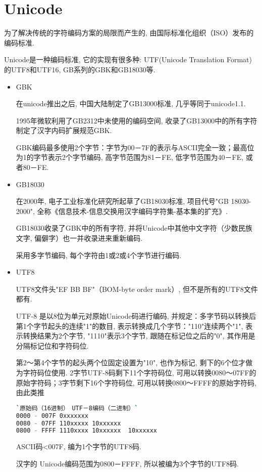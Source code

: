 \section*{\ZHH Unicode}{
    {为了解决传统的字符编码方案的局限而产生的, 由国际标准化组织（ISO）发布的编码标准. }\par
    {Unicode是一种编码标准, 它的实现有很多种: UTF(Unicode Translation Format)的UTF8和UTF16, GB系列的GBK和GB18030等. }\par
    \begin{itemize}
    \item{\ZHH \small GBK}\par{
        {在unicode推出之后, 中国大陆制定了GB13000标准, 几乎等同于unicode1.1.}\par
        {1995年微软利用了GB2312中未使用的编码空间, 收录了GB13000中的所有字符制定了汉字内码扩展规范GBK. }\par
        {GBK编码最多使用2个字节：字节为00－7F的表示与ASCII完全一致；最高位为1的字节表示2个字节编码, 高字节范围为81－FE, 低字节范围为40－FE, 或者80－FE.}\par
    }
    \item{\ZHH \small GB18030}\par{
        {在2000年, 电子工业标准化研究所起草了GB18030标准, 项目代号"GB 18030-2000", 全称《信息技术-信息交换用汉字编码字符集-基本集的扩充》.}\par
        {GB18030收录了GBK中的所有字符, 并将Unicode中其他中文字符（少数民族文字, 偏僻字）也一并收录进来重新编码. }\par
        {采用多字节编码, 每个字符由1或2或4个字节进行编码. }\par
    }
    \item{\ZHH \small UTF8}\par{
        {UTF8文件头"EF BB BF"（BOM-byte order mark）, 但不是所有的UTF8文件都有. }\par
        {UTF-8 是以8位为单元对原始Unicode码进行编码, 并规定：多字节码以转换后第1个字节起头的连续"1"的数目, 表示转换成几个字节："110"连续两个"1", 表示转换结果为2个字节, "1110"表示3个字节, 跟随在标记位之后的"0", 其作用是分隔标记位和字符码位. }\par
        {第2～第4个字节的起头两个位固定设置为"10", 也作为标记, 剩下的6个位才做为字符码位使用. 2字节UTF-8码剩下11个字符码位, 可用以转换0080～07FF的原始字符码；3字节剩下16个字符码位, 可用以转换0800～FFFF的原始字符码, 由此类推}\par
\begin{lstlisting}[language=bash]
`原始码（16进制）　UTF－8编码（二进制）`
0000 - 007F 0xxxxxxx
0080 - 07FF 110xxxxx 10xxxxxx
0800 - FFFF 1110xxxx 10xxxxxx  10xxxxxx
\end{lstlisting}
        {ASCII码<007F, 编为1个字节的UTF8码. }\par
        {汉字的 Unicode编码范围为0800－FFFF, 所以被编为3个字节的UTF8码. }\par

}
\end{itemize}}
